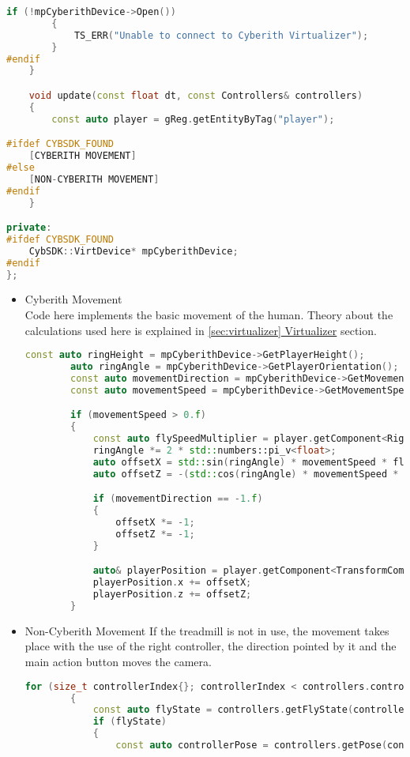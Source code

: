 \begin{itemize}
\begin{lstlisting}[language=c++, caption=Movement system (./engine/src/ecs/systems/movement\_system.hpp)]
        if (!mpCyberithDevice->Open())
        {
            TS_ERR("Unable to connect to Cyberith Virtualizer");
        }
#endif
    }

    void update(const float dt, const Controllers& controllers)
    {
        const auto player = gReg.getEntityByTag("player");

#ifdef CYBSDK_FOUND
    [CYBERITH MOVEMENT]
#else
    [NON-CYBERITH MOVEMENT]
#endif
    }

private:
#ifdef CYBSDK_FOUND
    CybSDK::VirtDevice* mpCyberithDevice;
#endif
};
\end{lstlisting}
    \begin{itemize}
        \item Cyberith Movement\\
        \label{cyb_movement}
        Code here implements the basic movement of the human. Theory about the calculations used here is explained in \hyperref[sec:virtualizer]{\ref*{sec:virtualizer} Virtualizer} section.
\begin{lstlisting}[language=c++, caption=Movement code with Cyberith (./engine/src/ecs/systems/movement\_system.hpp)]
        const auto ringHeight = mpCyberithDevice->GetPlayerHeight();
        auto ringAngle = mpCyberithDevice->GetPlayerOrientation();
        const auto movementDirection = mpCyberithDevice->GetMovementDirection();
        const auto movementSpeed = mpCyberithDevice->GetMovementSpeed();

        if (movementSpeed > 0.f)
        {
            const auto flySpeedMultiplier = player.getComponent<RigidBodyComponent>().velocity;
            ringAngle *= 2 * std::numbers::pi_v<float>;
            auto offsetX = std::sin(ringAngle) * movementSpeed * flySpeedMultiplier * dt;
            auto offsetZ = -(std::cos(ringAngle) * movementSpeed * flySpeedMultiplier * dt);

            if (movementDirection == -1.f)
            {
                offsetX *= -1;
                offsetZ *= -1;
            }

            auto& playerPosition = player.getComponent<TransformComponent>().pos;
            playerPosition.x += offsetX;
            playerPosition.z += offsetZ;
        }
\end{lstlisting}
        \item Non-Cyberith Movement
        \label{noncyb_movement}
        If the treadmill is not in use, the movement takes place with the use of the right controller, the direction pointed by it and the main action button moves the camera. 
\begin{lstlisting}[language=c++, caption=Movement code without Cyberith (./engine/src/ecs/systems/movement\_system.hpp)]
        for (size_t controllerIndex{}; controllerIndex < controllers.controllerCount; ++controllerIndex)
        {
            const auto flyState = controllers.getFlyState(controllerIndex);
            if (flyState)
            {
                const auto controllerPose = controllers.getPose(controllerIndex)[2];


\end{lstlisting}
\end{itemize}
\end{itemize}
